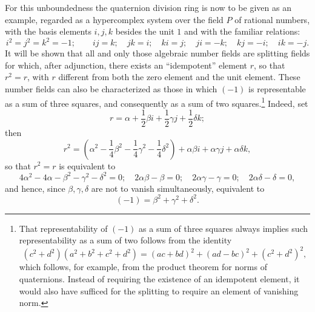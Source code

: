 \documentclass[11pt]{article}
\begin{document}
For this unboundedness the quaternion division ring is now to be given as an example, regarded as a hypercomplex system over the field $P$ of rational numbers, with the basis elements $i,j,k$ besides the unit $1$ and with the familiar relations:
\[
 i^2=j^2=k^2=-1;\qquad ij=k;\quad jk=i;\quad ki=j;\quad ji=-k;\quad kj=-i;\quad ik=-j.
\]
It will be shown that all and only those algebraic number fields are splitting fields for which, after adjunction, there exists an ``idempotent'' element $r$, so that $r^2=r$, with $r$ different from both the zero element and the unit element. These number fields can also be characterized as those in which $(-1)$ is representable as a sum of three squares, and consequently as a sum of two squares.\footnote{That representability of $(-1)$ as a sum of three squares always implies such representability as a sum of two follows from the identity
\[
(c^2+d^2)(a^2+b^2+c^2+d^2)=(ac+bd)^2+(ad-bc)^2+(c^2+d^2)^2,
\]
which follows, for example, from the product theorem for norms of quaternions. Instead of requiring the existence of an idempotent element, it would also have sufficed for the splitting to require an element of vanishing norm.} Indeed, set
\[
        r=\alpha+\frac12\beta i+\frac12\gamma j+\frac12\delta k;
\]
then
\[
        r^2=\left(\alpha^2-\frac14\beta^2-\frac14\gamma^2-\frac14\delta^2\right)
          +\alpha\beta i+\alpha\gamma j+\alpha\delta k,
\]
so that $r^2=r$ is equivalent to
\[
4\alpha^2-4\alpha-\beta^2-\gamma^2-\delta^2=0;\quad
2\alpha\beta-\beta=0;\quad 2\alpha\gamma-\gamma=0;\quad 2\alpha\delta-\delta=0,
\]
and hence, since $\beta,\gamma,\delta$ are not to vanish simultaneously, equivalent to
\[
        (-1)=\beta^2+\gamma^2+\delta^2.
\]
\end{document}
